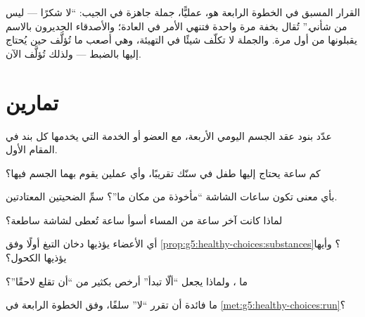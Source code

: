 \begin{example}\label{ex:g5:healthy-choices:answers}
القرار المسبق في الخطوة الرابعة هو، عمليًّا، جملة جاهزة في الجيب:
``لا شكرًا --- ليس من شأني.'' تُقال بخفة مرة واحدة فتنهي الأمر في
العادة؛ والأصدقاء الجديرون بالاسم يقبلونها من أول مرة. والجملة لا
تكلّف شيئًا في التهيئة، وهي أصعب ما تُؤلَّف حين يُحتاج إليها بالضبط
--- ولذلك تُؤلَّف الآن.
\end{example}

\section{تمارين}

\begin{exercise}[$\star$]\label{exo:g5:healthy-choices:1}
عدّد بنود عقد الجسم اليومي الأربعة، مع العضو أو الخدمة التي يخدمها
كل بند في المقام الأول.
\end{exercise}

\begin{exercise}[$\star$]\label{exo:g5:healthy-choices:2}
كم ساعة  يحتاج إليها طفل في سنّك تقريبًا، وأي عملين يقوم بهما
الجسم فيها؟
\end{exercise}

\begin{exercise}[$\star$]\label{exo:g5:healthy-choices:3}
بأي معنى تكون ساعات الشاشة ``مأخوذة من مكان ما''؟ سمِّ الضحيتين
المعتادتين.
\end{exercise}

\begin{exercise}[$\star$]\label{exo:g5:healthy-choices:4}
لماذا كانت آخر ساعة من المساء أسوأ ساعة تُعطى لشاشة ساطعة؟
\end{exercise}

\begin{exercise}[$\star$]\label{exo:g5:healthy-choices:5}
أي الأعضاء يؤذيها دخان التبغ أولًا وفق
\cref{prop:g5:healthy-choices:substances}؟ وأيها يؤذيها الكحول؟
\end{exercise}

\begin{exercise}[$\star$]\label{exo:g5:healthy-choices:6}
ما ، ولماذا يجعل ``ألّا تبدأ'' أرخص بكثير من ``أن تقلع
لاحقًا''؟
\end{exercise}

\begin{exercise}[$\star$]\label{exo:g5:healthy-choices:7}
ما فائدة أن تقرر ``لا'' سلفًا، وفق الخطوة الرابعة في
\cref{met:g5:healthy-choices:run}؟
\end{exercise}

